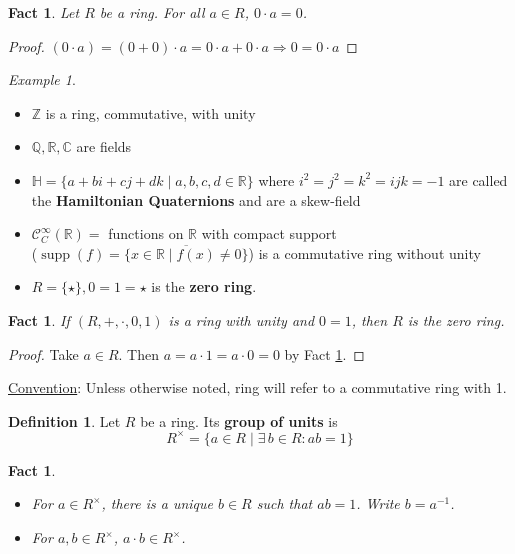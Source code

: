 \documentclass{amsart}
\newcommand{\RR}{\mathbb{R}}
\newcommand{\HH}{\mathbb{H}}
\newcommand{\QQ}{\mathbb{Q}}
\newcommand{\ZZ}{\mathbb{Z}}
\newcommand{\CC}{\mathbb{C}}
\DeclareMathOperator{\supp}{supp}
\newtheorem{fact}[thm]{Fact}
\theoremstyle{definition}
\newtheorem{defn}[thm]{Definition}
\theoremstyle{remark}
\newtheorem*{ex}{Example}
\begin{document}
\begin{fact}\label{fact:0prod}
 Let $R$ be a ring. For all $a \in R$, $0 \cdot a = 0$.
\end{fact}
\begin{proof}
    $(0 \cdot a) = (0 + 0) \cdot a = 0 \cdot a + 0 \cdot a \Rightarrow 0 = 0 \cdot a$
\end{proof}
\begin{ex} \hspace{0.5cm}
    \begin{itemize}
        \item $\ZZ$ is a ring, commutative, with unity
        \item $\QQ, \RR, \CC$ are fields
        \item $\HH = \{a + bi + cj + dk \mid a,b,c,d \in \RR \}$ where $i^2 = j^2 = k^2 = ijk = -1$ are
        called the \textbf{Hamiltonian Quaternions} and are a skew-field
        \item $\mathcal{C}^{\infty}_{C}(\RR) = $ functions on $\RR$ with compact
        support \\
        ($\supp(f) = \overline{\{x \in \RR \mid f(x) \neq 0\}}$) is a
        commutative ring without unity
        \item $R = \{\star\}, 0 = 1 = \star$ is the \textbf{zero ring}.
    \end{itemize}
\end{ex}
\begin{fact}
    If $(R,+,\cdot,0,1)$ is a ring with unity and $0 = 1$, then $R$ is the zero ring.
\end{fact}
\begin{proof}
    Take $a \in R$. Then $a = a \cdot 1 = a \cdot 0 = 0$ by Fact \ref{fact:0prod}.
\end{proof}
\noindent \underline{Convention}: Unless otherwise noted, ring will refer to
a commutative ring with 1.
\begin{defn}
    Let $R$ be a ring. Its \textbf{group of units} is
    $$
    R^\times = \{a \in R \mid \exists \, b \in R: ab = 1\}
    $$
\end{defn}
\begin{fact} \hspace{0.5cm}
    \begin{itemize}
        \item For $a \in R^\times$, there is a unique $b \in R$ such that $ab = 1$.
        Write $b = a^{-1}$.
        \item For $a,b \in R^\times$, $a \cdot b \in R^\times$.
    \end{itemize}
\end{fact}
\end{document}
